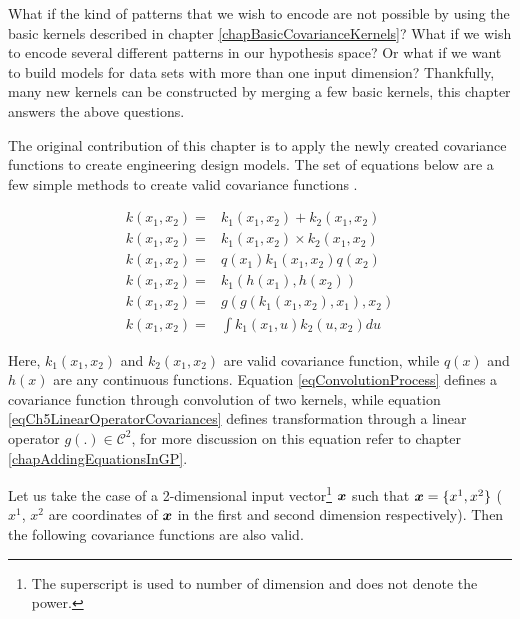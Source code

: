 What if the kind of patterns that we wish to encode are not possible by using the basic kernels described in chapter \ref{chapBasicCovarianceKernels}? What if we wish to encode several different patterns in our hypothesis space? Or what if we want to build models for data sets with more than one input dimension? Thankfully, many new kernels can be constructed by merging a few basic kernels, this chapter answers the above questions. 

The original contribution of this chapter is to apply the newly created covariance functions to create engineering design models. The set of equations below are a few simple methods to create valid covariance functions \cite{bishop2006pattern, mackay2003information, durrande2001etude, durrande2013anova}. 

\begin{align}
k(x_{1}, x_{2}) =  & k_{1}(x_{1}, x_{2}) + k_{2}(x_{1}, x_{2})  \label{eqCh5AddingCovariances} \\
k(x_{1}, x_{2}) =  & k_{1}(x_{1}, x_{2}) \times k_{2}(x_{1}, x_{2}) \label{eqCh5MultiplyingCovariances} \\
k(x_{1}, x_{2}) =  & q(x_{1})k_{1}(x_{1}, x_{2})q(x_{2}) \label{eqCh5MultiplyingWithFunction} \\
k(x_{1}, x_{2}) =  & k_{1}(h(x_{1}), h(x_{2})) \label{eqCh5ComposedCovariances} \\
k(x_{1}, x_{2}) =  & g(g(k_{1}(x_{1}, x_{2}), x_{1}), x_{2} ) \label{eqCh5LinearOperatorCovariances} \\
k(x_{1}, x_{2}) = & \int k_{1}(x_{1}, u)k_{2}(u, x_{2})du \label{eqConvolutionProcess}
\end{align}


Here, $k_{1}(x_{1}, x_{2})$ and $k_{2}(x_{1}, x_{2})$ are valid covariance function, while $q(x)$ and $h(x)$ are any continuous functions. Equation \ref{eqConvolutionProcess} defines a covariance function through convolution of two kernels, while equation \ref{eqCh5LinearOperatorCovariances} defines transformation through a linear operator $g\left ( . \right ) \in \mathcal{C}^{2}$, for more discussion on this equation refer to chapter \ref{chapAddingEquationsInGP}. 

Let us take the case of a 2-dimensional input vector\footnote{The superscript is used to number of dimension and does not denote the power.} $\boldsymbol{x}$ such that $\boldsymbol{x} = \{x^{1}, x^{2}\}$ ($x^{1}$, $x^{2}$ are coordinates of $\boldsymbol{x}$ in the first and second dimension respectively). Then the following covariance functions are also valid.

